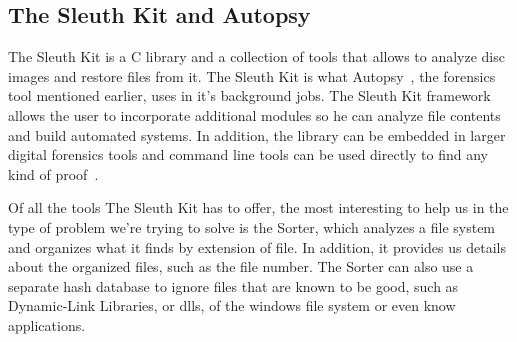 \subsection{The Sleuth Kit and Autopsy}

The Sleuth Kit is a C library and a collection of tools that allows to analyze disc images and restore files from it. The Sleuth Kit is what Autopsy~\cite{Autopsy}, the forensics tool mentioned earlier, uses in it's background jobs. The Sleuth Kit framework allows the user to incorporate additional modules so he can analyze file contents and build automated systems. In addition, the library can be embedded in larger digital forensics tools and command line tools can be used directly to find any kind of proof~\cite{tsk}. 

Of all the tools The Sleuth Kit has to offer, the most interesting to help us in the type of problem we're trying to solve is the Sorter, which analyzes a file system and organizes what it finds by extension of file. In addition, it provides us details about the organized files, such as the file \INODE number. The Sorter can also use a separate hash database to ignore files that are known to be good, such as Dynamic-Link Libraries, or dlls, of the windows file system or even know applications.


